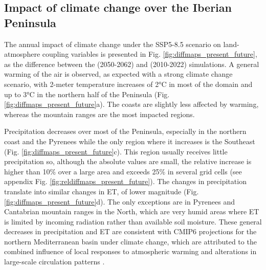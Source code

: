 \subsection{Impact of climate change over the Iberian Peninsula}

The annual impact of climate change under the SSP5-8.5 scenario on land-atmosphere coupling variables is presented in Fig. \ref{fig:diffmaps_present_future}, as the difference between the \futnoirr (2050-2062) and \presnoirr (2010-2022) simulations. 
A general warming of the air is observed, as expected with a strong climate change scenario, with 2-meter temperature increases of 2°C in most of the domain and up to 3°C in the northern half of the Peninsula (Fig. \ref{fig:diffmaps_present_future}a). The coasts are slightly less affected by warming, whereas the mountain ranges are the most impacted regions.

Precipitation decreases over most of the Peninsula, especially in the northern coast and the Pyrenees while the only region where it increases is the Southeast (Fig. \ref{fig:diffmaps_present_future}c). This region usually receives little precipitation so, although the absolute values are small, the relative increase is higher than 10\% over a large area and exceeds 25\% in several grid cells (see appendix Fig. \ref{fig:reldiffmaps_present_future}). 
The changes in precipitation translate into similar changes in ET, of lower magnitude (Fig. \ref{fig:diffmaps_present_future}d). The only exceptions are in  Pyrenees and Cantabrian mountain ranges in the North, which are very humid areas where ET is limited by incoming radiation rather than available soil moisture.
These general decreases in precipitation and ET are consistent with CMIP6 projections for the northern Mediterranean basin under climate change, which are attributed to the combined influence of local responses to atmospheric warming and alterations in large-scale circulation patterns \cite{tuel_understanding_2021, arjdal_future_2023}.

